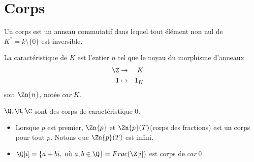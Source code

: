 \section{Corps}


\begin{definition}
	Un corps est un anneau commutatif dans lequel tout élément non nul de $K^* = k \setminus \{0\}$ est inversible.
\end{definition}

\begin{definition}
	La caractéristique de $K$ est l'entier $n$ tel que le noyau du morphisme d'anneaux
	\begin{eqnarray*}
		\Z &\to& K \\
		1 &\mapsto& 1_K
	\end{eqnarray*}
	soit $\Zn{n}$, notée $car \ K$.
\end{definition}

\begin{exemple}
	$\Q, \R, \C$ sont des corps de caractéristique 0.
	\begin{itemize}
		\item Lorsque $p$ est premier, $\Zn{p}$ et $\Zn{p}(T)$(corps des fractions) est un corps pour tout $p$. Notons que $\Zn{p}(T)$ est infini.
		\item $\Q[i] = \left\{ a + bi, \text{ où } a,b \in \Q\right\} = Frac (\Z[i])$ est corps de $car\ 0$
	\end{itemize}
\end{exemple}



